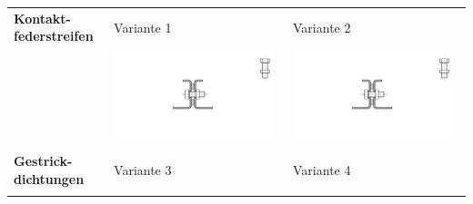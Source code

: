 \begin{longtable}{l p{6.55cm} p{6.55cm}}
         \begin{minipage}{2cm}\vspace*{5pt}\textbf{Kontakt-federstreifen}\end{minipage} & Variante 1 & Variante 2 \\ \nopagebreak
          & \noindent\begin{minipage}{6.5cm}
                \includegraphics[page=9, width=0.95\textwidth, trim = 12.5cm 7.5cm 9.5cm 6.5cm, clip]{Abbildungen/Kapitel3/Konzepte.pdf}
        \end{minipage} &
        \noindent\begin{minipage}{6.5cm}
                \includegraphics[page=10, width=0.95\textwidth, trim = 12.5cm 9cm 11cm 5cm, clip]{Abbildungen/Kapitel3/Konzepte.pdf}
        \end{minipage} \\
        & & \\
    \midrule
         \begin{minipage}{2cm}\vspace*{5pt}\textbf{Gestrick-dichtungen}\end{minipage} & Variante 3 & Variante 4 \\ \nopagebreak 

\end{longtable}
